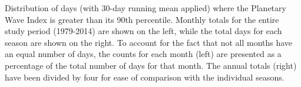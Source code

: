 \label{fig:annual_distribution}
Distribution of days (with 30-day running mean applied) where the Planetary Wave Index is greater than its 90th percentile. Monthly totals for the entire study period (1979-2014) are shown on the left, while the total days for each season are shown on the right. To account for the fact that not all months have an equal number of days, the counts for each month (left) are presented as a percentage of the total number of days for that month. The annual totals (right) have been divided by four for ease of comparison with the individual seasons.   